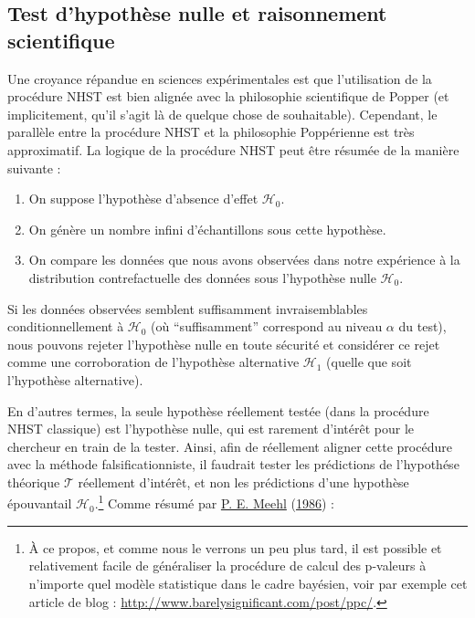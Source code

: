 \documentclass[
  a4paper,11pt,twoside,onecolumn,openright,final,oldfontcommands]{memoir}
\providecommand{\tightlist}{%
  \setlength{\itemsep}{0pt}\setlength{\parskip}{0pt}}
\theoremstyle{definition}
\theoremstyle{definition}
\theoremstyle{definition}
\theoremstyle{remark}
\begin{document}
\hypertarget{test-dhypothuxe8se-nulle-et-raisonnement-scientifique}{%
\subsection{Test d'hypothèse nulle et raisonnement scientifique}\label{test-dhypothuxe8se-nulle-et-raisonnement-scientifique}}

Une croyance répandue en sciences expérimentales est que l'utilisation de la procédure NHST est bien alignée avec la philosophie scientifique de Popper (et implicitement, qu'il s'agit là de quelque chose de souhaitable). Cependant, le parallèle entre la procédure NHST et la philosophie Poppérienne est très approximatif. La logique de la procédure NHST peut être résumée de la manière suivante :

\begin{enumerate}
\def\labelenumi{\arabic{enumi}.}
\tightlist
\item
  On suppose l'hypothèse d'absence d'effet \(\mathcal{H}_{0}\).
\item
  On génère un nombre infini d'échantillons sous cette hypothèse.
\item
  On compare les données que nous avons observées dans notre expérience à la distribution contrefactuelle des données sous l'hypothèse nulle \(\mathcal{H}_{0}\).
\end{enumerate}

Si les données observées semblent suffisamment invraisemblables conditionnellement à \(\mathcal{H}_{0}\) (où ``suffisamment'' correspond au niveau \(\alpha\) du test), nous pouvons rejeter l'hypothèse nulle en toute sécurité et considérer ce rejet comme une corroboration de l'hypothèse alternative \(\mathcal{H}_{1}\) (quelle que soit l'hypothèse alternative).

En d'autres termes, la seule hypothèse réellement testée (dans la procédure NHST classique) est l'hypothèse nulle, qui est rarement d'intérêt pour le chercheur en train de la tester. Ainsi, afin de réellement aligner cette procédure avec la méthode falsificationniste, il faudrait tester les prédictions de l'hypothése théorique \(\mathcal{T}\) réellement d'intérêt, et non les prédictions d'une hypothèse épouvantail \(\mathcal{H}_{0}\).\footnote{À ce propos, et comme nous le verrons un peu plus tard, il est possible et relativement facile de généraliser la procédure de calcul des p-valeurs à n'importe quel modèle statistique dans le cadre bayésien, voir par exemple cet article de blog : \url{http://www.barelysignificant.com/post/ppc/}.} Comme résumé par \protect\hyperlink{ref-meehl_what_1986}{P. E. Meehl} (\protect\hyperlink{ref-meehl_what_1986}{1986}) :
\end{document}
